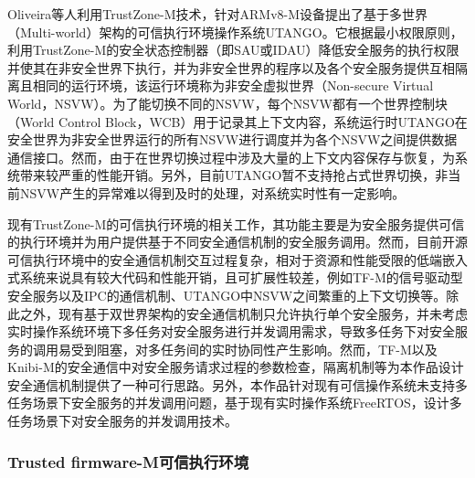 \documentclass[UTF8,12pt,a4paper]{ctexart}
\numberwithin{figure}{section}
\begin{document}
\par Oliveira\cite{uTango}等人利用TrustZone-M技术，针对ARMv8-M设备提出了基于多世界（Multi-world）架构的可信执行环境操作系统UTANGO。它根据最小权限原则，利用TrustZone-M的安全状态控制器（即SAU或IDAU）降低安全服务的执行权限并使其在非安全世界下执行，并为非安全世界的程序以及各个安全服务提供互相隔离且相同的运行环境，该运行环境称为非安全虚拟世界（Non-secure Virtual World，NSVW）。为了能切换不同的NSVW，每个NSVW都有一个世界控制块（World Control Block，WCB）用于记录其上下文内容，系统运行时UTANGO在安全世界为非安全世界运行的所有NSVW进行调度并为各个NSVW之间提供数据通信接口。然而，由于在世界切换过程中涉及大量的上下文内容保存与恢复，为系统带来较严重的性能开销。另外，目前UTANGO暂不支持抢占式世界切换，非当前NSVW产生的异常难以得到及时的处理，对系统实时性有一定影响。
\par 现有TrustZone-M的可信执行环境的相关工作，其功能主要是为安全服务提供可信的执行环境并为用户提供基于不同安全通信机制的安全服务调用。然而，目前开源可信执行环境中的安全通信机制交互过程复杂，相对于资源和性能受限的低端嵌入式系统来说具有较大代码和性能开销，且可扩展性较差，例如TF-M的信号驱动型安全服务以及IPC的通信机制、UTANGO中NSVW之间繁重的上下文切换等。除此之外，现有基于双世界架构的安全通信机制只允许执行单个安全服务，并未考虑实时操作系统环境下多任务对安全服务进行并发调用需求，导致多任务下对安全服务的调用易受到阻塞，对多任务间的实时协同性产生影响。然而，TF-M以及Knibi-M的安全通信中对安全服务请求过程的参数检查，隔离机制等为本作品设计安全通信机制提供了一种可行思路。另外，本作品针对现有可信操作系统未支持多任务场景下安全服务的并发调用问题，基于现有实时操作系统FreeRTOS，设计多任务场景下对安全服务的并发调用技术。


\subsubsection{Trusted firmware-M可信执行环境}
\end{document}
